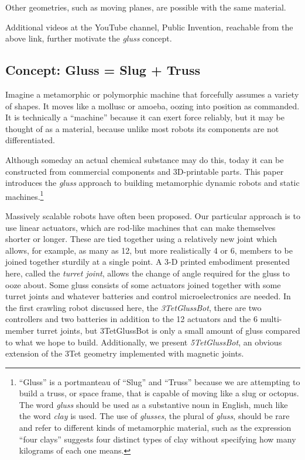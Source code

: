 \documentclass[11pt]{article}
\begin{document}
Other geometries, such as moving planes, are possible with the same material.

Additional videos at the YouTube channel, Public Invention, reachable from the above link,
further motivate the \emph{gluss} concept.


\subsection{Concept: Gluss = Slug + Truss}

Imagine a metamorphic or polymorphic machine that forcefully assumes a variety of shapes. It moves like a mollusc or amoeba,
oozing into position as commanded. It is technically a ``machine'' because it can exert force reliably, but
it may be thought of as a material, because unlike most robots its components are not differentiated.

Although someday an actual chemical substance may do this, today it can be constructed from commercial components
and 3D-printable parts. This paper introduces the \emph{gluss} approach to building metamorphic dynamic robots
and static machines.\footnote{ ``Gluss'' is a portmanteau of ``Slug'' and ``Truss'' because we are attempting to
build a truss, or space frame, that is capable of moving like a slug or octopus.
The word \textit{gluss}
should be used as a substantive noun in English, much like the word \textit{clay} is used.
The use of \textit{glusses}, the plural
of \textit{gluss}, should be rare and refer to different kinds of metamorphic material, such as the expression
``four clays'' suggests four distinct types of clay without specifying how many kilograms of each one means.}

Massively scalable robots have often been proposed. Our particular approach is to use linear actuators,
which are rod-like machines that can make themselves shorter or longer. These are tied together using
a relatively new joint \cite{song2003spherical} which allows, for example, as many as 12, but more realistically 4 or 6,
members to be joined together sturdily at a single point.
A 3-D printed embodiment presented here, called the \emph{turret joint}, allows the
change of angle required for the gluss to ooze about. Some gluss consists of some actuators joined together
with some turret joints and whatever batteries and control microelectronics are needed. In the first
crawling robot discussed here, the \emph{3TetGlussBot}, there are two controllers and two batteries
in addition to the 12 actuators and the 6 multi-member turret joints, but 3TetGlussBot is only
a small amount of gluss compared to what we hope to build. Additionally, we present \emph{5TetGlussBot}, an obvious extension of the
3Tet geometry implemented with magnetic joints.
\end{document}
